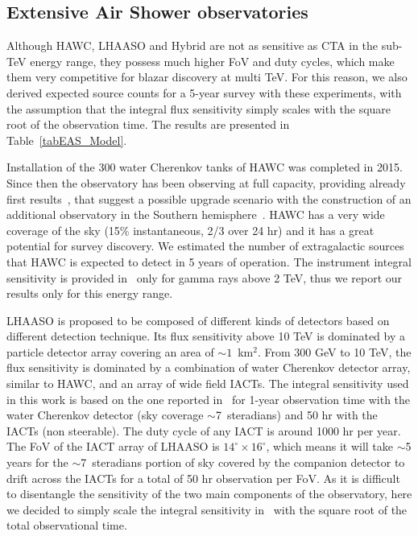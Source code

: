 \documentclass[final,5p]{elsarticle}
\begin{document}
\subsection{Extensive Air Shower observatories} Although HAWC, LHAASO and Hybrid are not as sensitive as CTA in the sub-TeV energy range, they possess much higher FoV and duty cycles, which make them very competitive for blazar discovery at multi TeV. For this reason, we also derived expected source counts for a 5-year survey with these experiments, with the assumption that the integral flux sensitivity simply scales with the square root of the observation time. The results are presented in Table~\ref{tabEAS_Model}. 

Installation of the 300 water Cherenkov tanks of HAWC was completed in 2015. Since then the observatory has been observing at full capacity, providing already first results~\cite{HAWCResults1,HAWCResults2,HAWCResults3,HAWCResults4}, that suggest a possible upgrade scenario with the construction of an additional observatory in the Southern hemisphere~\cite{HAWCSouth}. HAWC has a very wide coverage of the sky (15\% instantaneous, 2/3 over 24 hr) and it has a great potential for survey discovery. We estimated the number of extragalactic sources that HAWC is expected to detect in 5 years of operation. The instrument integral sensitivity is provided in~\cite{HAWCSens} only for gamma rays above 2 TeV, thus we report our results only for this energy range. 

LHAASO is proposed to be composed of different kinds of detectors based on different detection technique. Its flux sensitivity above 10 TeV is dominated by a particle detector array covering an area of $\sim1$~km$^2$\cite{LHASSOSens}. From 300 GeV to 10 TeV, the flux sensitivity is dominated by a combination of water Cherenkov detector array, similar to HAWC, and an array of wide field IACTs. The integral sensitivity used in this work is based on the one reported in~\cite{LHASSOSens} for 1-year observation time with the water Cherenkov detector (sky coverage $\sim$7~steradians) and 50 hr with the IACTs (non steerable). The duty cycle of any IACT is around 1000 hr per year. The FoV of the IACT array of LHAASO is $14^\circ \times 16^\circ$, which means it will take $\sim$5 years for the $\sim$7~steradians portion of sky covered by the companion detector to drift across the IACTs for a total of 50 hr observation per FoV. As it is difficult to disentangle the sensitivity of the two main components of the observatory, here we decided to simply scale the integral sensitivity in~\cite{LHASSOSens} with the square root of the total observational time. 
\end{document}
